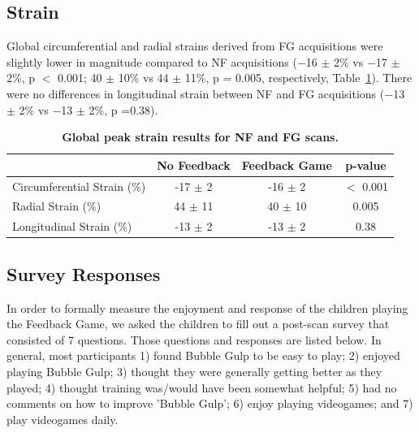 \subsection{Strain}
	Global circumferential and radial strains derived from FG acquisitions were slightly lower in magnitude compared to NF acquisitions (−16 $\pm$ 2\% vs −17 $\pm$ 2\%, p $<$ 0.001; 40 $\pm$ 10\% vs 44 $\pm$ 11\%, p = 0.005, respectively, Table~\ref{table:FG_strains}). There were no differences in longitudinal strain between NF and FG acquisitions (−13 $\pm$ 2\% vs −13 $\pm$ 2\%, p =0.38).
	
	\begin{table}
		\centering
		\caption[Global peak strain results for NF and FG scans]{\textbf{Global peak strain results for NF and FG scans.}}
		\label{table:FG_strains}
		\begin{tabular}{cccc}
			\toprule
			\multicolumn{1}{l}{}                            & \multicolumn{1}{c}{No Feedback} & \multicolumn{1}{c}{Feedback Game} & \multicolumn{1}{c}{p-value} \\ \midrule
			\multicolumn{1}{l}{Circumferential Strain (\%)} & \multicolumn{1}{c}{-17 $\pm$ 2} & \multicolumn{1}{c}{-16 $\pm$ 2} & \multicolumn{1}{c}{$<$ 0.001} \\ 
			\multicolumn{1}{l}{Radial Strain (\%)}          & \multicolumn{1}{c}{44 $\pm$ 11} & \multicolumn{1}{c}{40 $\pm$ 10} & \multicolumn{1}{c}{0.005} \\
			\multicolumn{1}{l}{Longitudinal Strain (\%)}    & \multicolumn{1}{c}{-13 $\pm$ 2} & \multicolumn{1}{c}{-13 $\pm$ 2} & \multicolumn{1}{c}{0.38} \\
			\bottomrule                                                 
		\end{tabular}
	\end{table}

\subsection{Survey Responses}
	In order to formally measure the enjoyment and response of the children playing the Feedback Game, we asked the children to fill out a post-scan survey that consisted of 7 questions. Those questions and responses are listed below. In general, most participants 1) found Bubble Gulp to be easy to play; 2) enjoyed playing Bubble Gulp; 3) thought they were generally getting better as they played; 4) thought training was/would have been somewhat helpful; 5) had no comments on how to improve 'Bubble Gulp'; 6) enjoy playing videogames; and 7) play videogames daily.


